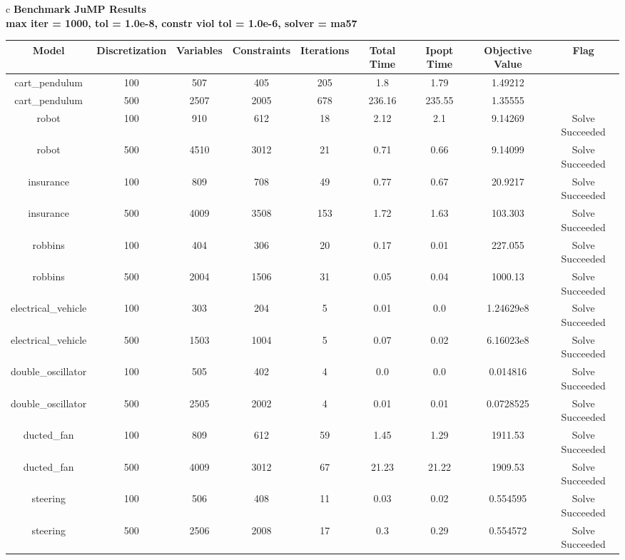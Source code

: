 \documentclass{standalone}
\begin{document}
\begin{tabular}{c}
\Large\textbf{Benchmark JuMP Results}\\
\large\textbf{max iter = 1000, tol = 1.0e-8, constr viol tol = 1.0e-6, solver = ma57}\\
\begin{tabular}{ccccccccc}
  \hline
  \textbf{Model} & \textbf{Discretization} & \textbf{Variables} & \textbf{Constraints} & \textbf{Iterations} & \textbf{Total Time} & \textbf{Ipopt Time} & \textbf{Objective Value} & \textbf{Flag} \\\hline
  cart\_pendulum & 100 & 507 & 405 & 205 & 1.8 & 1.79 & 1.49212 & \color{red}{Infeasible Problem} \\
  cart\_pendulum & 500 & 2507 & 2005 & 678 & 236.16 & 235.55 & 1.35555 & \color{red}{Infeasible Problem} \\
  robot & 100 & 910 & 612 & 18 & 2.12 & 2.1 & 9.14269 & Solve Succeeded \\
  robot & 500 & 4510 & 3012 & 21 & 0.71 & 0.66 & 9.14099 & Solve Succeeded \\
  insurance & 100 & 809 & 708 & 49 & 0.77 & 0.67 & 20.9217 & Solve Succeeded \\
  insurance & 500 & 4009 & 3508 & 153 & 1.72 & 1.63 & 103.303 & Solve Succeeded \\
  robbins & 100 & 404 & 306 & 20 & 0.17 & 0.01 & 227.055 & Solve Succeeded \\
  robbins & 500 & 2004 & 1506 & 31 & 0.05 & 0.04 & 1000.13 & Solve Succeeded \\
  electrical\_vehicle & 100 & 303 & 204 & 5 & 0.01 & 0.0 & 1.24629e8 & Solve Succeeded \\
  electrical\_vehicle & 500 & 1503 & 1004 & 5 & 0.07 & 0.02 & 6.16023e8 & Solve Succeeded \\
  double\_oscillator & 100 & 505 & 402 & 4 & 0.0 & 0.0 & 0.014816 & Solve Succeeded \\
  double\_oscillator & 500 & 2505 & 2002 & 4 & 0.01 & 0.01 & 0.0728525 & Solve Succeeded \\
  ducted\_fan & 100 & 809 & 612 & 59 & 1.45 & 1.29 & 1911.53 & Solve Succeeded \\
  ducted\_fan & 500 & 4009 & 3012 & 67 & 21.23 & 21.22 & 1909.53 & Solve Succeeded \\
  steering & 100 & 506 & 408 & 11 & 0.03 & 0.02 & 0.554595 & Solve Succeeded \\
  steering & 500 & 2506 & 2008 & 17 & 0.3 & 0.29 & 0.554572 & Solve Succeeded \\

\end{tabular}
\end{tabular}
\end{document}
